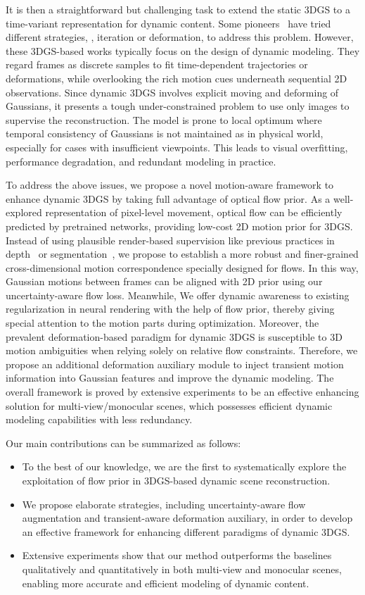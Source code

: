 \documentclass[runningheads]{llncs}
\begin{document}
It is then a straightforward but challenging task to extend the static 3DGS to a time-variant representation for dynamic content. Some pioneers~\cite{d3dgs,yang2023deformable,4dgs} have tried different strategies, \eg, iteration or deformation, to address this problem.
However, these 3DGS-based works typically focus on the design of dynamic modeling. They regard frames as discrete samples to fit time-dependent trajectories or deformations, while overlooking the rich motion cues underneath sequential 2D observations.
Since dynamic 3DGS involves explicit moving and deforming of Gaussians, it presents a tough under-constrained problem to use only images to supervise the reconstruction. 
The model is prone to local optimum where temporal consistency of Gaussians is not maintained as in physical world, especially for cases with insufficient viewpoints. 
This leads to visual overfitting, performance degradation, and redundant modeling in practice.

To address the above issues, we propose a novel motion-aware framework to enhance dynamic 3DGS by taking full advantage of optical flow prior. 
As a well-explored representation of pixel-level movement, optical flow can be efficiently predicted by pretrained networks, providing low-cost 2D motion prior for 3DGS. 
Instead of using plausible render-based supervision like previous practices in depth~\cite{dsnerf,depthnerf,chung2023depth} or segmentation~\cite{d3dgs}, we propose to establish a more robust and finer-grained cross-dimensional motion correspondence specially designed for flows.
In this way, Gaussian motions between frames can be aligned with 2D prior using our uncertainty-aware flow loss. 
Meanwhile, We offer dynamic awareness to existing regularization in neural rendering with the help of flow prior, thereby giving special attention to the motion parts during optimization.
Moreover, the prevalent deformation-based paradigm for dynamic 3DGS is susceptible to 3D motion ambiguities when relying solely on relative flow constraints. Therefore, we propose an additional deformation auxiliary module to inject transient motion information into Gaussian features and improve the dynamic modeling.
The overall framework is proved by extensive experiments to be an effective enhancing solution for multi-view/monocular scenes, which possesses efficient dynamic modeling capabilities with less redundancy.

Our main contributions can be summarized as follows:
%
\begin{itemize}
    \item To the best of our knowledge, we are the first to systematically explore the exploitation of flow prior in 3DGS-based dynamic scene reconstruction.
    \item We propose elaborate strategies, including uncertainty-aware flow augmentation and transient-aware deformation auxiliary, in order to develop an effective framework for enhancing different paradigms of dynamic 3DGS.
    \item Extensive experiments show that our method outperforms the baselines qualitatively and quantitatively in both multi-view and monocular scenes, enabling more accurate and efficient modeling of dynamic content.
\end{itemize}
\end{document}
